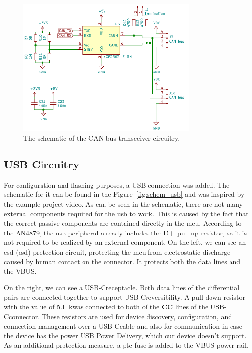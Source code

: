 \begin{figure}[H]
    \centering
    \includegraphics[width=0.8\textwidth]{obrazky/schem_can}
    \caption{The schematic of the CAN bus transceiver circuitry.}
    \label{fig:schem_can}
\end{figure}

\subsection{USB Circuitry}
\label{subsec:usb_circuitry}
For configuration and flashing purposes, a USB connection was added.
The schematic for it can be found in the Figure~\ref{fig:schem_usb} and was inspired by the example project video\cite{salmony_kicad_2020}.
As can be seen in the schematic, there are not many external components required for the \acs{usb} to work.
This is caused by the fact that the correct passive components are contained directly in the \acs{mcu}.
According to the AN4879\cite{stmicro_an4879_2018}, the \acs{usb} peripheral already includes the \textbf{D+} pull-up resistor, so it is not required to be realized by an external component.
On the left, we can see an \acs{esd} (\acl{esd}) protection circuit, protecting the \acs{mcu} from electrostatic discharge caused by human contact on the connector.
It protects both the data lines and the VBUS.

On the right, we can see a USB-C\texttrademark receptacle.
Both data lines of the differential pairs are connected together to support USB-C\texttrademark reversibility.
A pull-down resistor with the value of 5.1~k\textohm was connected to both of the \textbf{CC} lines of the USB-C\texttrademark connector.
These resistors are used for device discovery, configuration, and connection management over a USB-C\texttrademark cable and also for communication in case the device has the power USB Power Delivery\cite{stmicro_ta0357_2018}, which our device doesn't support.
As an additional protection measure, a \acs{ptc} fuse is added to the VBUS power rail.

